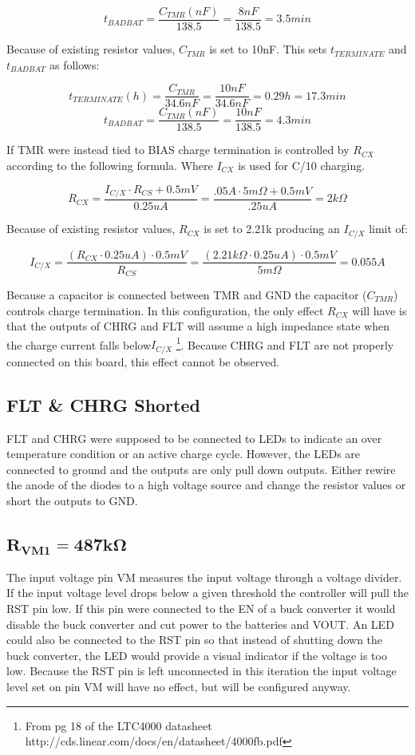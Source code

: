 \documentclass{article}
\begin{document}
\[t_{BADBAT} = \frac{C_{TMR}(nF)}{138.5} = \frac{8nF}{138.5}= 3.5min\]

Because of existing resistor values, $C_{TMR}$ is set to 10nF. This sets $t_{TERMINATE}$ and $t_{BADBAT}$ as follows:

\[ t_{TERMINATE}(h)= \frac{C_{TMR}}{ 34.6nF} = \frac{10nF}{34.6nF} = 0.29h = 17.3min\]
\[t_{BADBAT} = \frac{C_{TMR}(nF)}{138.5} = \frac{10nF}{138.5}= 4.3min\]

If TMR were instead tied to BIAS charge termination is controlled by $R_{CX}$ according to the following formula. Where $I_{CX}$ is used for C/10 charging.

\[R_{CX} = \frac{I_{C/X} \cdot R_{CS}+0.5mV}{0.25uA} = \frac{.05A\cdot5m\Omega + 0.5mV}{.25uA}=2k\Omega\]

Because of existing resistor values, $R_{CX}$ is set to 2.21k producing an $I_{C/X}$ limit of:

\[I_{C/X} = \frac{(R_{CX} \cdot 0.25uA) \cdot 0.5mV}{R_{CS}} = \frac{(2.21k\Omega \cdot 0.25uA) \cdot 0.5mV}{5m\Omega}  = 0.055 A \]

Because a capacitor is connected between TMR and GND the capacitor ($C_{TMR}$) controls charge termination. In this configuration, the only effect $R_{CX}$ will have is that the outputs of CHRG and FLT will assume a high impedance state when the charge current falls below$I_{C/X}$ \footnote{From pg 18  of the LTC4000 datasheet http://cds.linear.com/docs/en/datasheet/4000fb.pdf}. Because CHRG and FLT are not properly connected on this board, this effect cannot be observed. 

\subsection{FLT \& CHRG Shorted}
FLT and CHRG were supposed to be connected to LEDs to indicate an over temperature condition or an active charge cycle. However, the LEDs are connected to ground and the outputs are only pull down outputs. Either rewire the anode of the diodes to a high voltage source and change the resistor values or short the outputs to GND.

\subsection{$\mathbf{R_{VM1}=487k\Omega}$}
The input voltage pin VM measures the input voltage through a voltage divider. If the input voltage level drops below a given threshold the controller will pull the RST pin low. If this pin were connected to the EN of a buck converter it would disable the buck converter and cut power to the batteries and VOUT. An LED could also be connected to the RST pin so that instead of shutting down the buck converter, the LED would provide a visual indicator if the voltage is too low. Because the RST pin is left unconnected in this iteration the input voltage level set on pin VM will have no effect, but will be configured anyway. 
\end{document}
